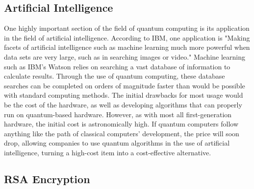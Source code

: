 \documentclass[10pt,journal,compsoc]{IEEEtran}
\begin{document}
 \subsection{Artificial Intelligence}
One highly important section of the field of quantum computing is its application in the field of artificial intelligence. According to IBM, one application is "Making facets of artificial intelligence such as machine learning much more powerful when data sets are very large, such as in searching images or video." Machine learning such as IBM's Watson relies on searching a vast database of information to calculate results. Through the use of quantum computing, these database searches can be completed on orders of magnitude faster than would be possible with standard computing methods\cite{IBM}. The initial drawbacks for most usage would be the cost of the hardware, as well as developing algorithms that can properly run on quantum-based hardware. However, as with most all first-generation hardware, the initial cost is astronomically high. If quantum computers follow anything like the path of classical computers' development, the price will soon drop, allowing companies to use quantum algorithms in the use of artificial intelligence, turning a high-cost item into a cost-effective alternative. 

 

\subsection{RSA Encryption}
\end{document}
